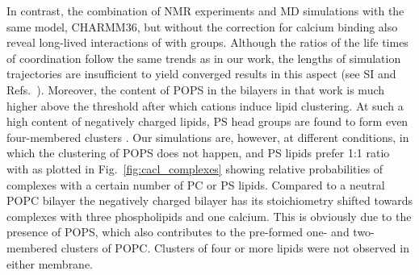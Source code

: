 \documentclass[journal=jpcbfk,manuscript=article]{achemso}
\begin{document}
In contrast, the combination of NMR experiments 
and MD simulations with the same model, CHARMM36, but without the correction for calcium binding
also reveal long-lived interactions of  with  groups. \cite{hallock18}
Although the ratios of the life times of coordination follow the same trends as in our work,
the lengths of simulation trajectories are insufficient 
to yield converged results in this aspect (see SI and Refs.~\cite{catte16, melcr18, nmrlipids_proj4}). 
Moreover, the content of POPS in the bilayers in that work is
much higher above the threshold after which 
 cations induce lipid clustering. \cite{hauser77,kurland79,hauser85,feigenson86,mattai89,roux90,roux91}
At such a high content of negatively charged lipids,
PS head groups are found to form even four-membered clusters \cite{hallock18}. 
Our simulations are, however, at different conditions,
in which the clustering of POPS does not happen, 
and PS lipids prefer 1:1 ratio with 
as plotted in Fig.~\ref{fig:cacl_complexes}
showing relative probabilities of  complexes with a certain number of PC or PS lipids. 
Compared to a neutral POPC bilayer
the negatively charged bilayer has its stoichiometry 
shifted towards complexes with three phospholipids and one calcium. 
This is obviously due to the presence of POPS, 
which also contributes to the pre-formed one- and two-membered clusters of POPC. 
Clusters of four or more lipids were not observed in either membrane. 



 
\end{document}
